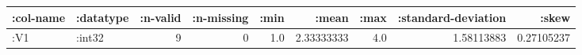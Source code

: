 \documentclass[]{article}
\begin{document}
\begin{longtable}[]{@{}llrrrrrrr@{}}
\toprule
\begin{minipage}[b]{0.08\columnwidth}\raggedright\strut
:col-name\strut
\end{minipage} & \begin{minipage}[b]{0.08\columnwidth}\raggedright\strut
:datatype\strut
\end{minipage} & \begin{minipage}[b]{0.08\columnwidth}\raggedleft\strut
:n-valid\strut
\end{minipage} & \begin{minipage}[b]{0.09\columnwidth}\raggedleft\strut
:n-missing\strut
\end{minipage} & \begin{minipage}[b]{0.05\columnwidth}\raggedleft\strut
:min\strut
\end{minipage} & \begin{minipage}[b]{0.09\columnwidth}\raggedleft\strut
:mean\strut
\end{minipage} & \begin{minipage}[b]{0.05\columnwidth}\raggedleft\strut
:max\strut
\end{minipage} & \begin{minipage}[b]{0.15\columnwidth}\raggedleft\strut
:standard-deviation\strut
\end{minipage} & \begin{minipage}[b]{0.09\columnwidth}\raggedleft\strut
:skew\strut
\end{minipage}\tabularnewline
\midrule
\endhead
\begin{minipage}[t]{0.08\columnwidth}\raggedright\strut
:V1\strut
\end{minipage} & \begin{minipage}[t]{0.08\columnwidth}\raggedright\strut
:int32\strut
\end{minipage} & \begin{minipage}[t]{0.08\columnwidth}\raggedleft\strut
9\strut
\end{minipage} & \begin{minipage}[t]{0.09\columnwidth}\raggedleft\strut
0\strut
\end{minipage} & \begin{minipage}[t]{0.05\columnwidth}\raggedleft\strut
1.0\strut
\end{minipage} & \begin{minipage}[t]{0.09\columnwidth}\raggedleft\strut
2.33333333\strut
\end{minipage} & \begin{minipage}[t]{0.05\columnwidth}\raggedleft\strut
4.0\strut
\end{minipage} & \begin{minipage}[t]{0.15\columnwidth}\raggedleft\strut
1.58113883\strut
\end{minipage} & \begin{minipage}[t]{0.09\columnwidth}\raggedleft\strut
0.27105237\strut
\end{minipage}\tabularnewline
\bottomrule
\end{longtable}
\end{document}
